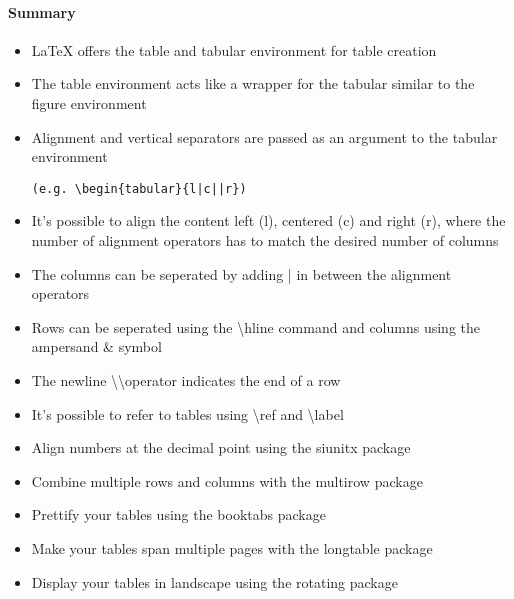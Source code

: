   \paragraph{Summary}
    \begin{itemize} %
      \item LaTeX offers the table and tabular environment for table creation
      \item The table environment acts like a wrapper for the tabular similar to the figure environment
      \item Alignment and vertical separators are passed as an argument to the tabular environment 
            \begin{verbatim}(e.g. \begin{tabular}{l|c||r}) \end{verbatim}
      \item It's possible to align the content left (l), centered (c) and right (r), where the number of alignment operators has to match the desired number of columns
      \item The columns can be seperated by adding | in between the alignment operators
      \item Rows can be seperated using the \textbackslash hline command and columns using the ampersand \& symbol
      \item The newline \textbackslash \textbackslash \enspace operator indicates the end of a row       
      \item It's possible to refer to tables using \textbackslash ref and \textbackslash label
      \item Align numbers at the decimal point using the siunitx package
      \item Combine multiple rows and columns with the multirow package
      \item Prettify your tables using the booktabs package
      \item Make your tables span multiple pages with the longtable package
      \item Display your tables in landscape using the rotating package
    \end{itemize} 